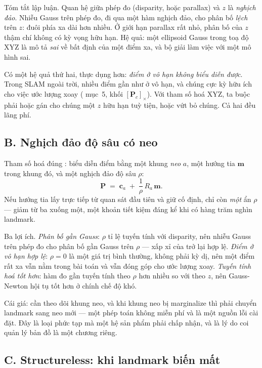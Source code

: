 \documentclass[../../vslam.tex]{subfiles}
\begin{document}
Tóm tắt lập luận. Quan hệ giữa phép đo (disparity, hoặc parallax) và \(z\) là \emph{nghịch đảo}. Nhiễu Gauss trên phép đo, đi qua một hàm nghịch đảo, cho phân bố \emph{lệch} trên \(z\): đuôi phía xa dài hơn nhiều. Ở giới hạn parallax rất nhỏ, phân bố của \(z\) thậm chí không có kỳ vọng hữu hạn. Hệ quả: một ellipsoid Gauss trong toạ độ XYZ là mô tả \emph{sai} về bất định của một điểm xa, và bộ giải làm việc với một mô hình sai.

Có một hệ quả thứ hai, thực dụng hơn: \emph{điểm ở vô hạn không biểu diễn được}. Trong SLAM ngoài trời, nhiều điểm gần như ở vô hạn, và chúng cực kỳ hữu ích cho việc ước lượng xoay ( mục~5, khối \([\mathbf{P}_c]_\times\)). Với tham số hoá XYZ, ta buộc phải hoặc gán cho chúng một \(z\) hữu hạn tuỳ tiện, hoặc vứt bỏ chúng. Cả hai đều lãng phí.

\subsection{B. Nghịch đảo độ sâu có neo}

Tham số hoá đúng \cite{civera2008inversedepth}: biểu diễn điểm bằng một khung \emph{neo} \(a\), một hướng tia \(\mathbf{m}\) trong khung đó, và một nghịch đảo độ sâu \(\rho\):
\[
\mathbf{P} \;=\; \mathbf{c}_a \;+\; \frac{1}{\rho}\,R_a\,\mathbf{m}.
\]
Nếu hướng tia lấy trực tiếp từ quan sát đầu tiên và giữ cố định, chỉ còn \emph{một} ẩn \(\rho\) --- giảm từ ba xuống một, một khoản tiết kiệm đáng kể khi có hàng trăm nghìn landmark.

Ba lợi ích. \emph{Phân bố gần Gauss}: \(\rho\) tỉ lệ tuyến tính với disparity, nên nhiễu Gauss trên phép đo cho phân bố gần Gauss trên \(\rho\) --- xấp xỉ của  trở lại hợp lệ. \emph{Điểm ở vô hạn hợp lệ}: \(\rho = 0\) là một giá trị bình thường, không phải kỳ dị, nên một điểm rất xa vẫn nằm trong bài toán và vẫn đóng góp cho ước lượng xoay. \emph{Tuyến tính hoá tốt hơn}: hàm đo gần tuyến tính theo \(\rho\) hơn nhiều so với theo \(z\), nên Gauss-Newton hội tụ tốt hơn ở chính chế độ khó.

Cái giá: cần theo dõi khung neo, và khi khung neo bị marginalize thì phải chuyển landmark sang neo mới --- một phép toán không miễn phí và là một nguồn lỗi cài đặt. Đây là loại phức tạp mà một hệ sản phẩm phải chấp nhận, và là lý do  coi quản lý bản đồ là một chương riêng.

\subsection{C. Structureless: khi landmark biến mất}
\end{document}
